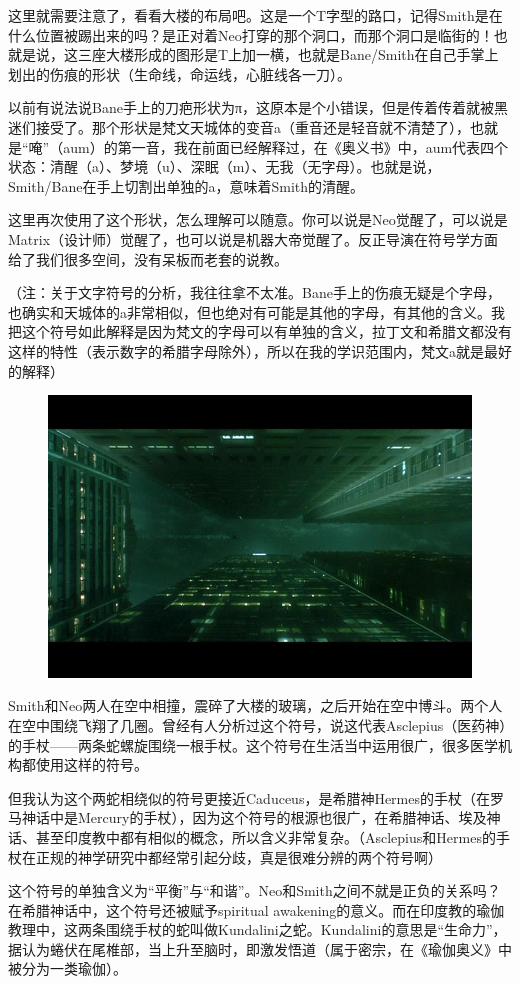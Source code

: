\documentclass[UTF8]{ctexart}
\begin{document}
这里就需要注意了，看看大楼的布局吧。这是一个T字型的路口，记得Smith是在什么位置被踢出来的吗？是正对着Neo打穿的那个洞口，而那个洞口是临街的！也就是说，这三座大楼形成的图形是T上加一横，也就是Bane/Smith在自己手掌上划出的伤痕的形状（生命线，命运线，心脏线各一刀）。

以前有说法说Bane手上的刀疤形状为π，这原本是个小错误，但是传着传着就被黑迷们接受了。那个形状是梵文天城体的变音a（重音还是轻音就不清楚了），也就是“唵”（aum）的第一音，我在前面已经解释过，在《奥义书》中，aum代表四个状态：清醒（a）、梦境（u）、深眠（m）、无我（无字母）。也就是说，Smith/Bane在手上切割出单独的a，意味着Smith的清醒。

这里再次使用了这个形状，怎么理解可以随意。你可以说是Neo觉醒了，可以说是Matrix（设计师）觉醒了，也可以说是机器大帝觉醒了。反正导演在符号学方面给了我们很多空间，没有呆板而老套的说教。

（注：关于文字符号的分析，我往往拿不太准。Bane手上的伤痕无疑是个字母，也确实和天城体的a非常相似，但也绝对有可能是其他的字母，有其他的含义。我把这个符号如此解释是因为梵文的字母可以有单独的含义，拉丁文和希腊文都没有这样的特性（表示数字的希腊字母除外），所以在我的学识范围内，梵文a就是最好的解释）

\begin{figure}[htb]
\centering
\includegraphics[width=0.5\linewidth]{fig/5fe26438c566852096ddd873.jpg}
\end{figure}

Smith和Neo两人在空中相撞，震碎了大楼的玻璃，之后开始在空中博斗。两个人在空中围绕飞翔了几圈。曾经有人分析过这个符号，说这代表Asclepius（医药神）的手杖——两条蛇螺旋围绕一根手杖。这个符号在生活当中运用很广，很多医学机构都使用这样的符号。

但我认为这个两蛇相绕似的符号更接近Caduceus，是希腊神Hermes的手杖（在罗马神话中是Mercury的手杖），因为这个符号的根源也很广，在希腊神话、埃及神话、甚至印度教中都有相似的概念，所以含义非常复杂。（Asclepius和Hermes的手杖在正规的神学研究中都经常引起分歧，真是很难分辨的两个符号啊）

这个符号的单独含义为“平衡”与“和谐”。Neo和Smith之间不就是正负的关系吗？在希腊神话中，这个符号还被赋予spiritual awakening的意义。而在印度教的瑜伽教理中，这两条围绕手杖的蛇叫做Kundalini之蛇。Kundalini的意思是“生命力”，据认为蜷伏在尾椎部，当上升至脑时，即激发悟道（属于密宗，在《瑜伽奥义》中被分为一类瑜伽）。
\end{document}
